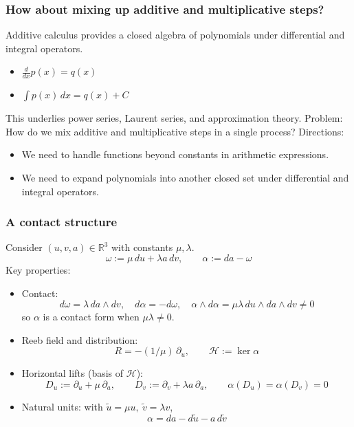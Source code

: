 \documentclass[aspectratio=169]{beamer}
\begin{document}
\begin{frame}
    \frametitle{How about mixing up additive and multiplicative steps?}
    Additive calculus provides a closed algebra of polynomials under differential and integral operators.
    \begin{itemize}
        \item $\frac{d}{dx} p(x) = q(x)$
        \item $\int p(x)\,dx = q(x) + C$
    \end{itemize}
    This underlies power series, Laurent series, and approximation theory.
    \newline\newline
    Problem: How do we mix additive and multiplicative steps in a single process?
    \newline\newline
    Directions:
    \begin{itemize}
        \item We need to handle functions beyond constants in arithmetic expressions.
        \item We need to expand polynomials into another closed set under differential and integral operators.
    \end{itemize}
\end{frame}

\begin{frame}
    \frametitle{A contact structure}
    Consider $(u,v,a)\in\mathbb{R}^3$ with constants $\mu,\lambda$.
    \[
      \omega := \mu\,du + \lambda a\,dv,\qquad \alpha := da - \omega
    \]
    Key properties:
    \begin{itemize}
      \item Contact:
      \[
        d\omega=\lambda\,da\wedge dv,\quad d\alpha=-d\omega,\quad
        \alpha\wedge d\alpha=\mu\lambda\,du\wedge da\wedge dv\neq 0
      \]
      so $\alpha$ is a contact form when $\mu\lambda\neq 0$.
      \item Reeb field and distribution:
      \[
        R=-(1/\mu)\,\partial_u,\qquad \mathcal{H}:=\ker\alpha
      \]
      \item Horizontal lifts (basis of $\mathcal{H}$):
      \[
        D_u:=\partial_u+\mu\,\partial_a,\qquad
        D_v:=\partial_v+\lambda a\,\partial_a,\qquad \alpha(D_u)=\alpha(D_v)=0
      \]
      \item Natural units: with $\tilde u=\mu u,\ \tilde v=\lambda v$,
      \[
        \alpha=da-d\tilde u-a\,d\tilde v
      \]
    \end{itemize}
\end{frame}
\end{document}
